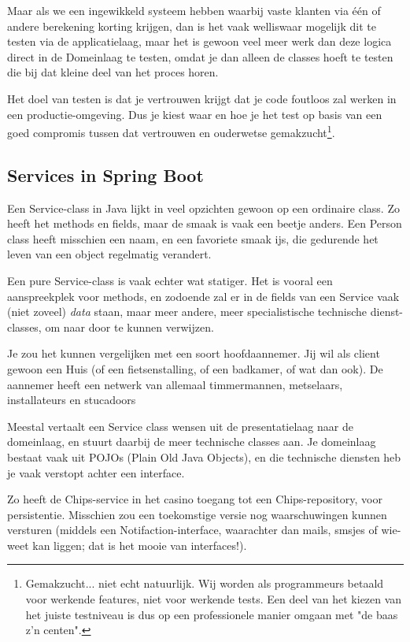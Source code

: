Maar als we een ingewikkeld systeem hebben waarbij vaste klanten via één of andere berekening korting krijgen,
dan is het vaak welliswaar mogelijk dit te testen via de applicatielaag, maar het is gewoon veel meer werk
dan deze logica direct in de Domeinlaag te testen, omdat je dan alleen de classes hoeft te testen die bij dat
kleine deel van het proces horen.

Het doel van testen is dat je vertrouwen krijgt dat je code foutloos zal werken in een productie-omgeving. Dus
je kiest waar en hoe je het test op basis van een goed compromis tussen dat vertrouwen en ouderwetse gemakzucht\footnote{
    Gemakzucht... niet echt natuurlijk. Wij worden als programmeurs betaald voor werkende features, niet voor 
    werkende tests. Een deel van het kiezen van het juiste testniveau is dus op een professionele manier omgaan
    met "de baas z'n centen".
}.

\subsection{Services in Spring Boot}

Een Service-class in Java lijkt in veel opzichten gewoon op een ordinaire class. Zo heeft het methods
en fields, maar de smaak is vaak een beetje anders. Een Person class heeft misschien een naam, en een 
favoriete smaak ijs, die gedurende het leven van een object regelmatig verandert.

Een pure Service-class is vaak echter wat statiger. Het is vooral een aanspreekplek voor methods, en zodoende zal
er in de fields van een Service vaak (niet zoveel) \emph{data} staan, maar meer andere, meer specialistische
technische dienst-classes, om naar door te kunnen verwijzen.

Je zou het kunnen vergelijken met een soort hoofdaannemer. Jij wil als client gewoon een Huis 
(of een fietsenstalling, of een badkamer, of wat dan ook). De aannemer heeft een netwerk van 
allemaal timmermannen, metselaars, installateurs en stucadoors

Meestal vertaalt een Service class wensen uit de presentatielaag naar de domeinlaag, en stuurt daarbij de meer
technische classes aan. Je domeinlaag bestaat vaak uit POJOs (Plain Old Java Objects), en die technische diensten 
heb je vaak verstopt achter een interface.

Zo heeft de Chips-service in het casino toegang tot een Chips-repository, voor persistentie. Misschien zou
een toekomstige versie nog waarschuwingen kunnen versturen (middels een Notifaction-interface, waarachter dan 
mails, smsjes of wie-weet kan liggen; dat is het mooie van interfaces!).

